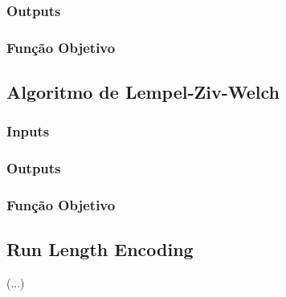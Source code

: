 \documentclass[a4paper,12pt,titlepage]{article}
\begin{document}
\subsubsection*{Outputs}


\subsubsection*{Função Objetivo}

\subsection{Algoritmo de Lempel-Ziv-Welch}
\subsubsection*{Inputs}

\subsubsection*{Outputs}

\subsubsection*{Função Objetivo}


\subsection*{Run Length Encoding}
(...)

\linebreak
\linebreak
\linebreak
\linebreak
\end{document}
